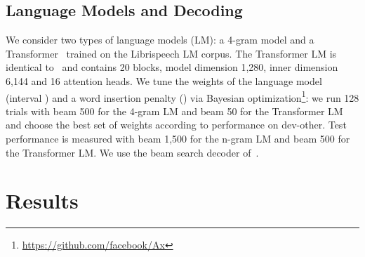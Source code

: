 \documentclass{article}
\newcommand{\libri}{Librispeech}
\begin{document}
\subsection{Language Models and Decoding}

We consider two types of language models (LM): a 4-gram model and a Transformer~\citep{baevski2018adaptive} trained on the \libri{} LM corpus.
The Transformer LM is identical to~\citep{synnaeve2020end} and contains 20 blocks, model dimension 1,280, inner dimension 6,144 and 16 attention heads. 
We tune the weights of the language model (interval ) and a word insertion penalty () via Bayesian optimization\footnote{\url{https://github.com/facebook/Ax}}: 
we run 128 trials with beam 500 for the 4-gram LM and beam 50 for the Transformer LM and choose the best set of weights according to performance on dev-other.
Test performance is measured with beam 1,500 for the n-gram LM and beam 500 for the Transformer LM.
We use the beam search decoder of~\cite{pratap2019w2l}.

\section{Results}
\label{sec:results}
\end{document}
